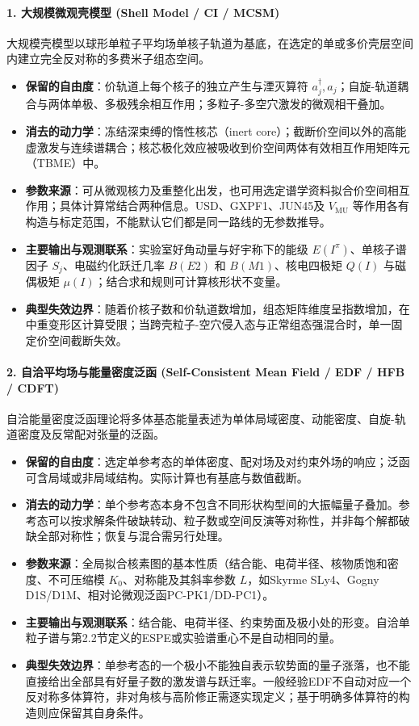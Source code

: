 \paragraph{1. 大规模微观壳模型 (Shell Model / CI / MCSM)}
大规模壳模型以球形单粒子平均场单核子轨道为基底，在选定的单或多价壳层空间内建立完全反对称的多费米子组态空间。
\begin{itemize}
\item \textbf{保留的自由度}：价轨道上每个核子的独立产生与湮灭算符 $a^\dagger_j, a_j$；自旋-轨道耦合与两体单极、多极残余相互作用；多粒子-多空穴激发的微观相干叠加。
\item \textbf{消去的动力学}：冻结深束缚的惰性核芯（inert core）；截断价空间以外的高能虚激发与连续谱耦合；核芯极化效应被吸收到价空间两体有效相互作用矩阵元（TBME）中。
\item \textbf{参数来源}：可从微观核力及重整化出发，也可用选定谱学资料拟合价空间相互作用；具体计算常结合两种信息。USD、GXPF1、JUN45及 $V_{\mathrm{MU}}$ 等作用各有构造与标定范围，不能默认它们都是同一路线的无参数推导。\cite{doctoral-r1-g28-otsuka-2023-type-ii-shell-evolution}
\item \textbf{主要输出与观测联系}：实验室好角动量与好宇称下的能级 $E(I^\pi)$、单核子谱因子 $S_j$、电磁约化跃迁几率 $B(E2)$ 和 $B(M1)$、核电四极矩 $Q(I)$ 与磁偶极矩 $\mu(I)$；结合求和规则可计算核形状不变量。
\item \textbf{典型失效边界}：随着价核子数和价轨道数增加，组态矩阵维度呈指数增加，在中重变形区计算受限；当跨壳粒子-空穴侵入态与正常组态强混合时，单一固定价空间截断失效。
\end{itemize}

\paragraph{2. 自洽平均场与能量密度泛函 (Self-Consistent Mean Field / EDF / HFB / CDFT)}
自洽能量密度泛函理论将多体基态能量表述为单体局域密度、动能密度、自旋-轨道密度及反常配对张量的泛函。
\begin{itemize}
\item \textbf{保留的自由度}：选定单参考态的单体密度、配对场及对约束外场的响应；泛函可含局域或非局域结构。实际计算也有基底与数值截断。
\item \textbf{消去的动力学}：单个参考态本身不包含不同形状构型间的大振幅量子叠加。参考态可以按求解条件破缺转动、粒子数或空间反演等对称性，并非每个解都破缺全部对称性；恢复与混合需另行处理。
\item \textbf{参数来源}：全局拟合核素图的基本性质（结合能、电荷半径、核物质饱和密度、不可压缩模 $K_0$、对称能及其斜率参数 $L$，如Skyrme SLy4、Gogny D1S/D1M、相对论微观泛函PC-PK1/DD-PC1）。
\item \textbf{主要输出与观测联系}：结合能、电荷半径、约束势面及极小处的形变。自洽单粒子谱与第2.2节定义的ESPE或实验谱重心不是自动相同的量。
\item \textbf{典型失效边界}：单参考态的一个极小不能独自表示软势面的量子涨落，也不能直接给出全部具有好量子数的激发谱与跃迁率。一般经验EDF不自动对应一个反对称多体算符，非对角核与高阶修正需逐实现定义；基于明确多体算符的构造则应保留其自身条件。
\end{itemize}

